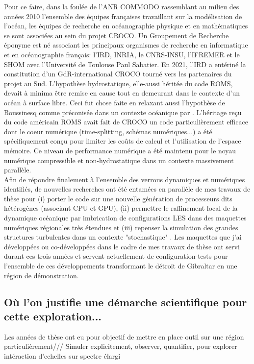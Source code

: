 Pour ce faire, dans la foulée de l’ANR COMMODO rassemblant au milieu des années 2010 l’ensemble des équipes françaises travaillant sur la modélisation de l’océan, les équipes de recherche en océanographie physique et en mathématiques se sont associées au sein du projet CROCO. Un Groupement de Recherche éponyme est né associant les principaux organismes de recherche en informatique et en océanographie français: l’IRD, INRIA, le CNRS-INSU, l’IFREMER et le SHOM avec l'Université de Toulouse Paul Sabatier. En 2021, l’IRD a entériné la constitution d’un GdR-international CROCO tourné vers les partenaires du projet au Sud. L'hypothèse hydrostatique, elle-aussi héritée du code ROMS, devait à minima être remise en cause tout en demeurant dans le contexte d'un océan à surface libre. Ceci fut chose faite en relaxant aussi l'hypothèse de Boussinesq comme préconisée dans un contexte océanique par \cite{auclair_non-hydrostatic_2018}. L'héritage reçu du code américain ROMS \citep{shchepetkin_regional_2005} avait fait de CROCO un code particulièrement efficace dont le coeur numérique (time-splitting, schémas numériques...) a été spécifiquement conçu pour limiter les coûts de calcul et l'utilisation de l'espace mémoire. Ce niveau de performance numérique a été maintenu pour le noyau numérique compressible et non-hydrostatique dans un contexte massivement parallèle.\\
Afin de répondre finalement à l'ensemble des verrous dynamiques et numériques identifiés, de nouvelles recherches ont été entamées en parallèle de mes travaux de thèse pour (i) porter le code sur une nouvelle génération de processeurs dits hétérogènes (associant CPU et GPU), (ii) permettre le raffinement local de la dynamique océanique par imbrication de configurations LES dans des maquettes numériques régionales très étendues et (iii) repenser la simulation des grandes structures turbulentes dans un contexte "stochastique" \cite{memin_fluid_2014}. Les maquettes que j'ai développées ou co-développées dans le cadre de mes travaux de thèse ont servi durant ces trois années et servent actuellement de configuration-tests pour l'ensemble de ces développements transformant le détroit de Gibraltar en une région de démonstration. \\
\color{blue}
\subsection{Où l'on justifie une démarche scientifique pour cette exploration...}
\color{black}
Les années de thèse ont eu pour objectif de mettre en place outil sur une région particulièrement/// Simuler explicitement, observer, quantifier, pour explorer intéraction d'echelles sur spectre élargi


